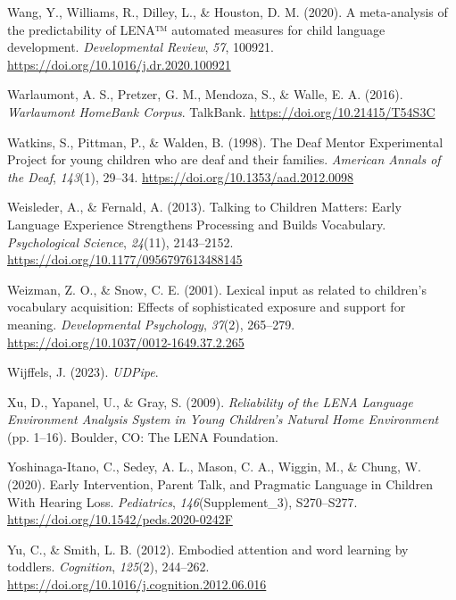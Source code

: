 \documentclass[
  man,floatsintext]{apa6}
\newlength{\cslhangindent}
\newlength{\cslentryspacingunit} %
\newenvironment{CSLReferences}[2] %
 {%
  \setlength{\parindent}{0pt}
  \ifodd #1
  \let\oldpar\par
  \def\par{\hangindent=\cslhangindent\oldpar}
  \fi
  \setlength{\parskip}{#2\cslentryspacingunit}
 }%
 {}
\begin{document}
\begin{CSLReferences}{1}{0}
\leavevmode{}%
Wang, Y., Williams, R., Dilley, L., \& Houston, D. M. (2020). A meta-analysis of the predictability of {LENA}™ automated measures for child language development. \emph{Developmental Review}, \emph{57}, 100921. \url{https://doi.org/10.1016/j.dr.2020.100921}

\leavevmode{}%
Warlaumont, A. S., Pretzer, G. M., Mendoza, S., \& Walle, E. A. (2016). \emph{Warlaumont {HomeBank Corpus}}. TalkBank. \url{https://doi.org/10.21415/T54S3C}

\leavevmode{}%
Watkins, S., Pittman, P., \& Walden, B. (1998). The {Deaf Mentor Experimental Project} for young children who are deaf and their families. \emph{American Annals of the Deaf}, \emph{143}(1), 29--34. \url{https://doi.org/10.1353/aad.2012.0098}

\leavevmode{}%
Weisleder, A., \& Fernald, A. (2013). Talking to {Children Matters}: {Early Language Experience Strengthens Processing} and {Builds Vocabulary}. \emph{Psychological Science}, \emph{24}(11), 2143--2152. \url{https://doi.org/10.1177/0956797613488145}

\leavevmode{}%
Weizman, Z. O., \& Snow, C. E. (2001). Lexical input as related to children's vocabulary acquisition: Effects of sophisticated exposure and support for meaning. \emph{Developmental Psychology}, \emph{37}(2), 265--279. \url{https://doi.org/10.1037/0012-1649.37.2.265}

\leavevmode{}%
Wijffels, J. (2023). \emph{{UDPipe}}.

\leavevmode{}%
Xu, D., Yapanel, U., \& Gray, S. (2009). \emph{Reliability of the {LENA Language Environment Analysis System} in {Young Children}'s {Natural Home Environment}} (pp. 1--16). Boulder, CO: The LENA Foundation.

\leavevmode{}%
Yoshinaga-Itano, C., Sedey, A. L., Mason, C. A., Wiggin, M., \& Chung, W. (2020). Early {Intervention}, {Parent Talk}, and {Pragmatic Language} in {Children With Hearing Loss}. \emph{Pediatrics}, \emph{146}(Supplement\_3), S270--S277. \url{https://doi.org/10.1542/peds.2020-0242F}

\leavevmode{}%
Yu, C., \& Smith, L. B. (2012). Embodied attention and word learning by toddlers. \emph{Cognition}, \emph{125}(2), 244--262. \url{https://doi.org/10.1016/j.cognition.2012.06.016}

\end{CSLReferences}
\end{document}
